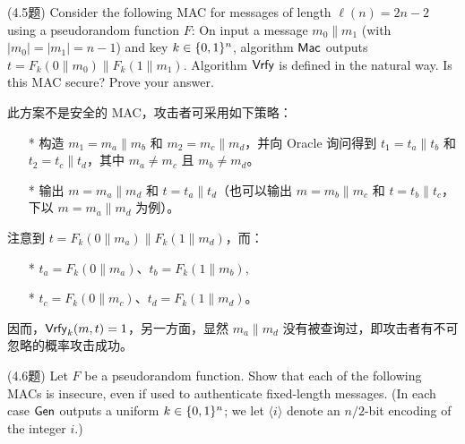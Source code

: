 \begin{questions}
    \question (4.5题) Consider the following MAC for messages of length $\ell(n)=2n-2$ using a pseudorandom function $F$: On input a message $m_0\parallel{m_1}$ (with $|m_0|=|m_1|=n-1$) and key $k\in\{{0,1}\}^n$, algorithm $\mathsf{Mac}$ outputs $t=F_k(0\parallel{m_0})\parallel{F_k}(1\parallel{m_1})$. Algorithm $\mathsf{Vrfy}$ is defined in the natural way. Is this MAC secure? Prove your answer.

        \begin{solution}
            \newline
            此方案不是安全的 MAC，攻击者可采用如下策略：
            \begin{enumerate}
                \item[*] 构造 $m_1=m_a\parallel{m_b}$ 和 $m_2=m_c\parallel{m_d}$，并向 Oracle 询问得到 $t_1=t_a\parallel{t_b}$ 和 $t_2=t_c\parallel{t_d}$，其中 $m_a\neq{m_c}$ 且 $m_b\neq{m_d}$。
                \item[*] 输出 $m=m_a\parallel{m_d}$ 和 $t=t_a\parallel{t_d}$（也可以输出 $m=m_b\parallel{m_c}$ 和 $t=t_b\parallel{t_c}$，下以 $m=m_a\parallel{m_d}$ 为例）。
            \end{enumerate}
            注意到 $t=F_k(0\parallel{m_a})\parallel{F_k}(1\parallel{m_d})$，而：
            \begin{enumerate}
                \item[*] $t_a=F_k(0\parallel{m_a})$、$t_b=F_k(1\parallel{m_b})$,
                \item[*] $t_c=F_k(0\parallel{m_c})$、$t_d=F_k(1\parallel{m_d})$。
            \end{enumerate}
            因而，$\mathsf{Vrfy}_k(m,t)=1$，另一方面，显然 $m_a\parallel{m_d}$ 没有被查询过，即攻击者有不可忽略的概率攻击成功。
        \end{solution}

    \question (4.6题) Let $F$ be a pseudorandom function. Show that each of the following MACs is insecure, even if used to authenticate fixed-length messages. (In each case $\mathsf{Gen}$ outputs a uniform $k\in\{{0,1}\}^n$; we let $\langle{i}\rangle$ denote an $n/2$-bit encoding of the integer $i$.)


\end{questions}
